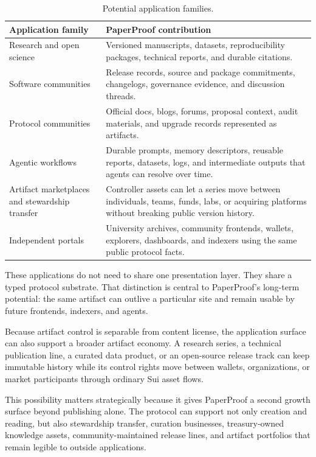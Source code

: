 \documentclass[11pt]{article}
\begin{document}
\begin{table}[htbp]
\centering
\caption{Potential application families.}
\begin{tabularx}{\textwidth}{p{}X}
\toprule
\textbf{Application family} & \textbf{PaperProof contribution} \\
\midrule
Research and open science & Versioned manuscripts, datasets, reproducibility packages, technical reports, and durable citations. \\
Software communities & Release records, source and package commitments, changelogs, governance evidence, and discussion threads. \\
Protocol communities & Official docs, blogs, forums, proposal context, audit materials, and upgrade records represented as artifacts. \\
Agentic workflows & Durable prompts, memory descriptors, reusable reports, datasets, logs, and intermediate outputs that agents can resolve over time. \\
Artifact marketplaces and stewardship transfer & Controller assets can let a series move between individuals, teams, funds, labs, or acquiring platforms without breaking public version history. \\
Independent portals & University archives, community frontends, wallets, explorers, dashboards, and indexers using the same public protocol facts. \\
\bottomrule
\end{tabularx}
\end{table}

These applications do not need to share one presentation layer. They share a
typed protocol substrate. That distinction is central to PaperProof's
long-term potential: the same artifact can outlive a particular site and remain
usable by future frontends, indexers, and agents.

Because artifact control is separable from content license, the application
surface can also support a broader artifact economy. A research series, a
technical publication line, a curated data product, or an open-source release
track can keep immutable history while its control rights move between wallets,
organizations, or market participants through ordinary Sui asset flows.

This possibility matters strategically because it gives PaperProof a second
growth surface beyond publishing alone. The protocol can support not only
creation and reading, but also stewardship transfer, curation businesses,
treasury-owned knowledge assets, community-maintained release lines, and
artifact portfolios that remain legible to outside applications.
\end{document}
